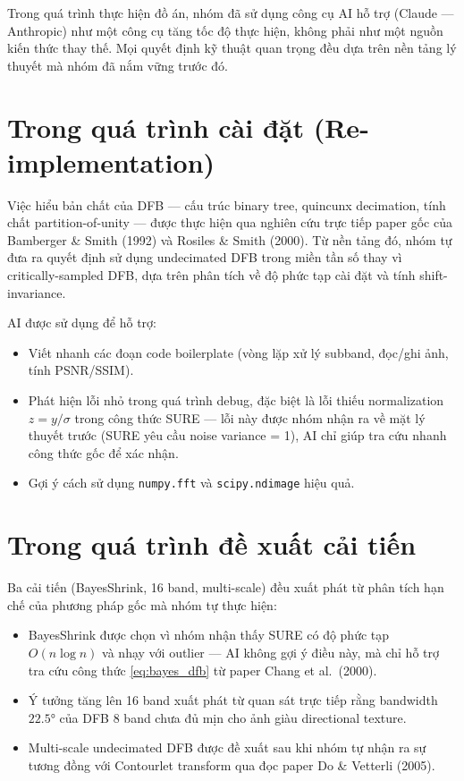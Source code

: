 Trong quá trình thực hiện đồ án, nhóm đã sử dụng công cụ AI hỗ trợ (Claude --- Anthropic) như một công cụ tăng tốc độ thực hiện, không phải như một nguồn kiến thức thay thế. Mọi quyết định kỹ thuật quan trọng đều dựa trên nền tảng lý thuyết mà nhóm đã nắm vững trước đó.

\section*{Trong quá trình cài đặt (Re-implementation)}

Việc hiểu bản chất của DFB --- cấu trúc binary tree, quincunx decimation, tính chất partition-of-unity --- được thực hiện qua nghiên cứu trực tiếp paper gốc của Bamberger \& Smith (1992) và Rosiles \& Smith (2000). Từ nền tảng đó, nhóm tự đưa ra quyết định sử dụng undecimated DFB trong miền tần số thay vì critically-sampled DFB, dựa trên phân tích về độ phức tạp cài đặt và tính shift-invariance.

AI được sử dụng để hỗ trợ:
\begin{itemize}
    \item Viết nhanh các đoạn code boilerplate (vòng lặp xử lý subband, đọc/ghi ảnh, tính PSNR/SSIM).
    \item Phát hiện lỗi nhỏ trong quá trình debug, đặc biệt là lỗi thiếu normalization $z = y/\sigma$ trong công thức SURE --- lỗi này được nhóm nhận ra về mặt lý thuyết trước (SURE yêu cầu noise variance = 1), AI chỉ giúp tra cứu nhanh công thức gốc để xác nhận.
    \item Gợi ý cách sử dụng \texttt{numpy.fft} và \texttt{scipy.ndimage} hiệu quả.
\end{itemize}

\section*{Trong quá trình đề xuất cải tiến}

Ba cải tiến (BayesShrink, 16 band, multi-scale) đều xuất phát từ phân tích hạn chế của phương pháp gốc mà nhóm tự thực hiện:
\begin{itemize}
    \item BayesShrink được chọn vì nhóm nhận thấy SURE có độ phức tạp $O(n\log n)$ và nhạy với outlier --- AI không gợi ý điều này, mà chỉ hỗ trợ tra cứu công thức \eqref{eq:bayes_dfb} từ paper Chang et al.\ (2000).
    \item Ý tưởng tăng lên 16 band xuất phát từ quan sát trực tiếp rằng bandwidth $22.5°$ của DFB 8 band chưa đủ mịn cho ảnh giàu directional texture.
    \item Multi-scale undecimated DFB được đề xuất sau khi nhóm tự nhận ra sự tương đồng với Contourlet transform qua đọc paper Do \& Vetterli (2005).
\end{itemize}

